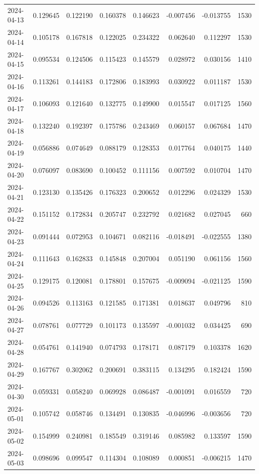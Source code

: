 \begin{tabular}{lrrrrrrr}
2024-04-13 & 0.129645 & 0.122190 & 0.160378 & 0.146623 & -0.007456 & -0.013755 & 1530 \\
2024-04-14 & 0.105178 & 0.167818 & 0.122025 & 0.234322 & 0.062640 & 0.112297 & 1530 \\
2024-04-15 & 0.095534 & 0.124506 & 0.115423 & 0.145579 & 0.028972 & 0.030156 & 1410 \\
2024-04-16 & 0.113261 & 0.144183 & 0.172806 & 0.183993 & 0.030922 & 0.011187 & 1530 \\
2024-04-17 & 0.106093 & 0.121640 & 0.132775 & 0.149900 & 0.015547 & 0.017125 & 1560 \\
2024-04-18 & 0.132240 & 0.192397 & 0.175786 & 0.243469 & 0.060157 & 0.067684 & 1470 \\
2024-04-19 & 0.056886 & 0.074649 & 0.088179 & 0.128353 & 0.017764 & 0.040175 & 1440 \\
2024-04-20 & 0.076097 & 0.083690 & 0.100452 & 0.111156 & 0.007592 & 0.010704 & 1470 \\
2024-04-21 & 0.123130 & 0.135426 & 0.176323 & 0.200652 & 0.012296 & 0.024329 & 1530 \\
2024-04-22 & 0.151152 & 0.172834 & 0.205747 & 0.232792 & 0.021682 & 0.027045 & 660 \\
2024-04-23 & 0.091444 & 0.072953 & 0.104671 & 0.082116 & -0.018491 & -0.022555 & 1380 \\
2024-04-24 & 0.111643 & 0.162833 & 0.145848 & 0.207004 & 0.051190 & 0.061156 & 1560 \\
2024-04-25 & 0.129175 & 0.120081 & 0.178801 & 0.157675 & -0.009094 & -0.021125 & 1590 \\
2024-04-26 & 0.094526 & 0.113163 & 0.121585 & 0.171381 & 0.018637 & 0.049796 & 810 \\
2024-04-27 & 0.078761 & 0.077729 & 0.101173 & 0.135597 & -0.001032 & 0.034425 & 690 \\
2024-04-28 & 0.054761 & 0.141940 & 0.074793 & 0.178171 & 0.087179 & 0.103378 & 1620 \\
2024-04-29 & 0.167767 & 0.302062 & 0.200691 & 0.383115 & 0.134295 & 0.182424 & 1590 \\
2024-04-30 & 0.059331 & 0.058240 & 0.069928 & 0.086487 & -0.001091 & 0.016559 & 720 \\
2024-05-01 & 0.105742 & 0.058746 & 0.134491 & 0.130835 & -0.046996 & -0.003656 & 720 \\
2024-05-02 & 0.154999 & 0.240981 & 0.185549 & 0.319146 & 0.085982 & 0.133597 & 1590 \\
2024-05-03 & 0.098696 & 0.099547 & 0.114304 & 0.108089 & 0.000851 & -0.006215 & 1470 \\

\end{tabular}
